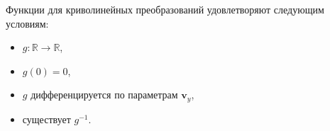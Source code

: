 \documentclass[12pt,twoside]{article}
\newcommand{\bv}{\mathbf{v}}
\begin{document}
Функции для криволинейных преобразований удовлетворяют следующим условиям:
\begin{itemize}
    \item $g: \mathbb{R} \to \mathbb{R}$,
    \item $g(0) = 0$,
    \item $g$ дифференцируется по параметрам $\bv_y$,
    \item существует $g^{-1}$.
\end{itemize}
\end{document}
